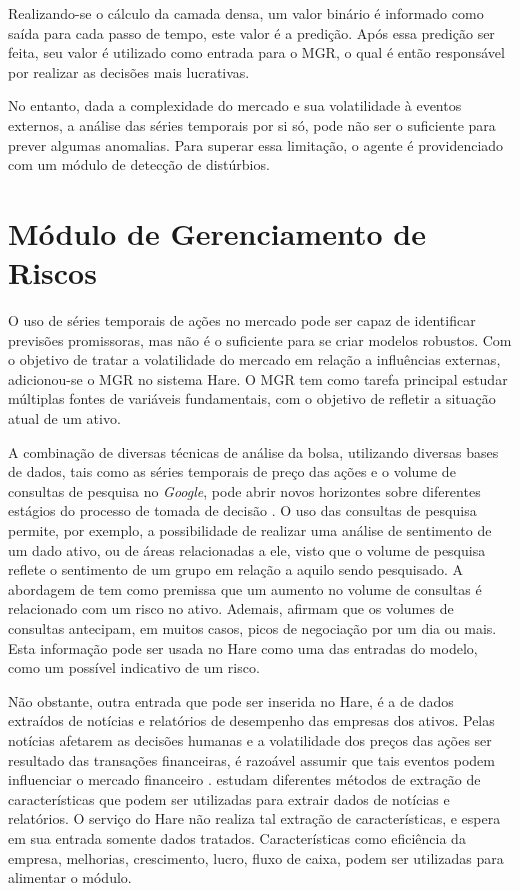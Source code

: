 Realizando-se o cálculo da camada densa, um valor binário é informado como saída para cada passo de tempo, este valor é a predição. Após essa predição ser feita, seu valor é utilizado como entrada para o \acrshort{MGR}, o qual é então responsável por realizar as decisões mais lucrativas. 

No entanto, dada a complexidade do mercado e sua volatilidade à eventos externos, a análise das séries temporais por si só, pode não ser o suficiente para prever algumas anomalias. Para superar essa limitação, o agente é providenciado com um módulo de detecção de distúrbios.


\section{Módulo de Gerenciamento de Riscos}
\label{SEC:RMS}

O uso de séries temporais de ações no mercado pode ser capaz de identificar previsões promissoras, mas não é o suficiente para se criar modelos robustos. Com o objetivo de tratar a volatilidade do mercado em relação a influências externas, adicionou-se o \acrfull{MGR} no sistema Hare. O \acrshort{MGR} tem como tarefa principal estudar múltiplas fontes de variáveis fundamentais, com o objetivo de refletir a situação atual de um ativo. 

A combinação de diversas técnicas de análise da bolsa, utilizando diversas bases de dados, tais como as séries temporais de preço das ações e o volume de consultas de pesquisa no \emph{Google}, pode abrir novos horizontes sobre diferentes estágios do processo de tomada de decisão \cite{google_trends}. O uso das consultas de pesquisa permite, por exemplo, a possibilidade de realizar uma análise de sentimento de um dado ativo, ou de áreas relacionadas a ele, visto que o volume de pesquisa reflete o sentimento de um grupo em relação a aquilo sendo pesquisado. A abordagem de \textcite{google_trends} tem como premissa que um aumento no volume de consultas é relacionado com um risco no ativo. Ademais, \textcite{bib2} afirmam que os volumes de consultas antecipam, em muitos casos, picos de negociação por um dia ou mais. Esta informação pode ser usada no Hare como uma das entradas do modelo, como um possível indicativo de um risco. 

Não obstante, outra entrada que pode ser inserida no Hare, é a de dados extraídos de notícias e relatórios de desempenho das empresas dos ativos. Pelas notícias afetarem as decisões humanas e a volatilidade dos preços das ações ser resultado das transações financeiras, é razoável assumir que tais eventos podem influenciar o mercado financeiro \cite{structured_events}. \textcite{financial_news, structured_events, clustering_report} estudam diferentes métodos de extração de características que podem ser utilizadas para extrair dados de notícias e relatórios. O serviço do Hare não realiza tal extração de características, e espera em sua entrada somente dados tratados. Características como eficiência da empresa, melhorias, crescimento, lucro, fluxo de caixa, podem ser utilizadas para alimentar o módulo.

